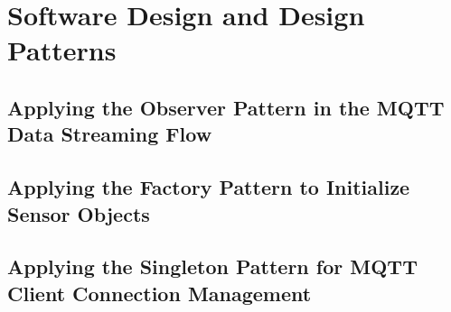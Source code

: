 \clearpage
\section{Software Design and Design Patterns}
\subsection{Applying the Observer Pattern in the MQTT Data Streaming Flow}
\subsection{Applying the Factory Pattern to Initialize Sensor Objects}
\subsection{Applying the Singleton Pattern for MQTT Client Connection Management}